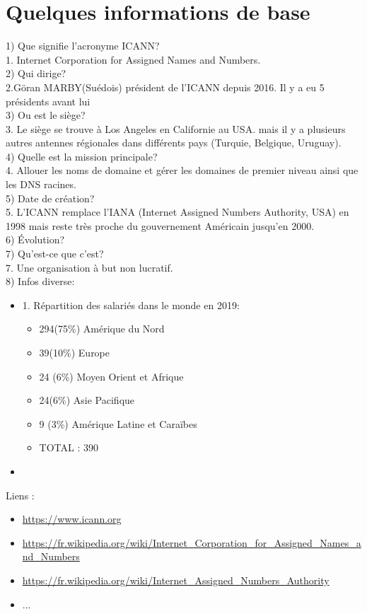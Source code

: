 \documentclass{article}
\begin{document}

\section{Quelques informations de base}
1) Que signifie l'acronyme ICANN?\\
1. Internet Corporation for Assigned Names and Numbers.\\

2) Qui dirige?\\
2.Göran MARBY(Suédois) président de l'ICANN depuis 2016. Il y a eu 5 présidents avant lui\\

3) Ou est le siège?\\
3. Le siège se trouve à Los Angeles en Californie au USA. mais il y a plusieurs autres antennes régionales dans différents pays (Turquie, Belgique, Uruguay).\\

4) Quelle est la mission principale?\\
4. Allouer les noms de domaine et gérer les domaines de premier niveau ainsi que les DNS racines.\\

5) Date de création?\\
5. L'ICANN remplace l'IANA (Internet Assigned Numbers Authority, USA) en 1998 mais reste très proche du gouvernement Américain jusqu'en 2000.\\
 
6) Évolution?\\


7) Qu'est-ce que c'est?\\
7. Une organisation à but non lucratif.\\


8) Infos diverse:
\begin{itemize}
	\item 1. Répartition des salariés dans le monde en 2019:
	\begin{itemize}
		\item 294(75\%) Amérique du Nord
		\item 39(10\%) Europe
		\item 24 (6\%) Moyen Orient et Afrique
		\item 24(6\%) Asie Pacifique
		\item 9 (3\%) Amérique Latine et Caraïbes
		\item TOTAL : 390\\
	\end{itemize}
	\item   
\end{itemize}


Liens :\\
\begin{itemize}
	\item \url{https://www.icann.org}
	\item \url{https://fr.wikipedia.org/wiki/Internet_Corporation_for_Assigned_Names_and_Numbers}
	\item \url{https://fr.wikipedia.org/wiki/Internet_Assigned_Numbers_Authority}
	\item ...
\end{itemize}
\end{document}
